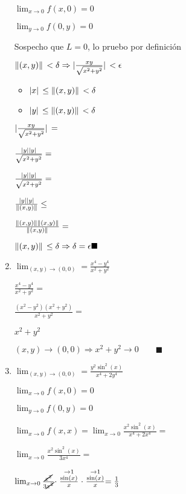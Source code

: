 \documentclass[../practica_03.tex]{subfiles}
\begin{document}
\begin{enumerate}
            $\lim_{x\to0} f(x,0) = 0 $

            $\lim_{y\to0} f(0,y) = 0 $

            Sospecho que $L=0$, lo pruebo por definición

            $\norm*{(x,y)} < \delta \Rightarrow \abs*{\frac{xy}{\sqrt{x^2+y^2}}} < \epsilon $

            \begin{itemize}
                \item $\abs*{x} \leq \norm*{(x,y)} < \delta$
                \item $\abs*{y} \leq \norm*{(x,y)} < \delta$
            \end{itemize}

            $\abs*{\frac{xy}{\sqrt{x^2+y^2}}} = $

            $\frac{\abs*{y}\abs*{y}}{\sqrt{x^2+y^2}} = $

            $\frac{\abs*{y}\abs*{y}}{\sqrt{x^2+y^2}} = $

            $\frac{\abs*{y}\abs*{y}}{\norm*{(x,y)}} \leq $

            $\frac{\norm*{(x,y)}\norm*{(x,y)}}{\norm*{(x,y)}} = $
            
            $\norm*{(x,y)} \leq \delta \Rightarrow \delta = \epsilon \blacksquare$

        \item $\lim_{(x,y)\to(0,0)} = \frac{x^4-y^4}{x^2+y^2}$

            $\frac{x^4-y^4}{x^2+y^2} = $

            $\frac{(x^2-y^2)(x^2+y^2)}{x^2+y^2} = $

            $x^2+y^2$

            $ (x,y) \to (0,0) \Rightarrow x^2+y^2 \to 0 \qquad \blacksquare$

        \item $\lim_{(x,y)\to(0,0)} = \frac{y^2\sin^2(x)}{x^4+2y^4}$

            $\lim_{x\to0} f(x,0) = 0 $

            $\lim_{y\to0} f(0,y) = 0 $

            $\lim_{x\to0} f(x,x) = \lim_{x\to0} \frac{x^2\sin^2(x)}{x^4+2x^4} = $
            
            $\lim_{x\to0} \frac{x^2\sin^2(x)}{3x^4} = $

            $\lim_{x\to0} \frac{\cancel{x^2}}{3\cancel{x^2}} \cdot \stackrel{\to 1}{\frac{\sin(x)}{x}} \cdot \stackrel{\to 1}{\frac{\sin(x)}{x}} = \frac{1}{3} $


\end{enumerate}
\end{document}

